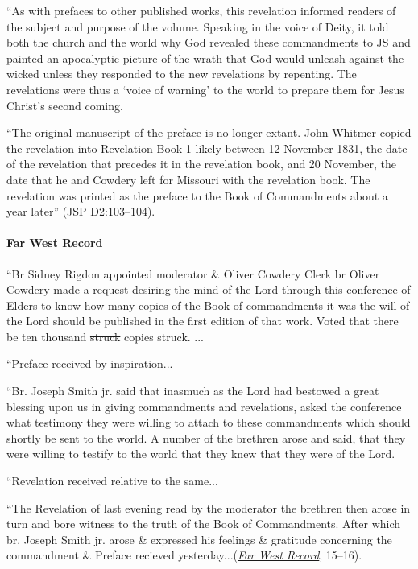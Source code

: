 			``As with prefaces to other published works, this revelation informed readers of the subject and purpose of the volume. Speaking in the voice of Deity, it told both the church and the world why God revealed these commandments to JS and painted an apocalyptic picture of the wrath that God would unleash against the wicked unless they responded to the new revelations by repenting. The revelations were thus a `voice of warning' to the world to prepare them for Jesus Christ's second coming.
			
			``The original manuscript of the preface is no longer extant. John Whitmer copied the revelation into Revelation Book 1 likely between 12 November 1831, the date of the revelation that precedes it in the revelation book, and 20 November, the date that he and Cowdery left for Missouri with the revelation book. The revelation was printed as the preface to the Book of Commandments about a year later'' (JSP D2:103--104).
			
		\paragraph{Far West Record}
		
			``Br Sidney Rigdon appointed moderator \& Oliver Cowdery Clerk br Oliver Cowdery made a request desiring the mind of the Lord through this conference of Elders to know how many copies of the Book of commandments it was the will of the Lord should be published in the first edition of that work. Voted that there be ten thousand \sout{struck} copies struck. ...
			
			``Preface received by inspiration...
			
			``Br. Joseph Smith jr. said that inasmuch as the Lord had bestowed a great blessing upon us in giving commandments and revelations, asked the conference what testimony they were willing to attach to these commandments which should shortly be sent to the world. A number of the brethren arose and said, that they were willing to testify to the world that they knew that they were of the Lord.
			
			``Revelation received relative to the same...
			
			``The Revelation of last evening read by the moderator the brethren then arose in turn and bore witness to the truth of the Book of Commandments. After which br. Joseph Smith jr. arose \& expressed his feelings \& gratitude concerning the commandment \& Preface recieved yesterday...(\href{https://www.josephsmithpapers.org/paper-summary/minute-book-2/17}{\textit{Far West Record}}, 15--16).
			
